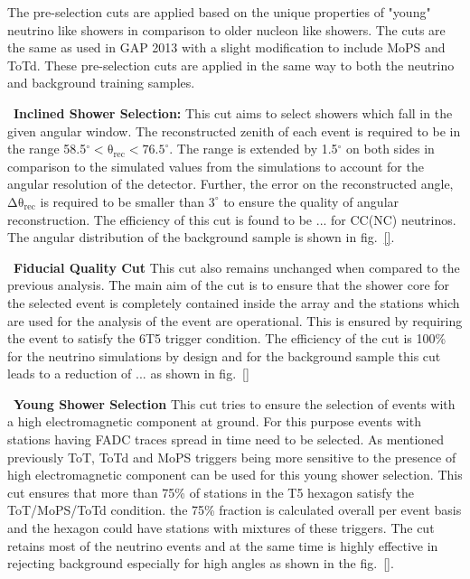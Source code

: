 The pre-selection cuts are applied based on the unique properties of "young" neutrino like showers in comparison to older nucleon like showers. The cuts are the same as used in GAP 2013 with a slight modification to include MoPS and ToTd. These pre-selection cuts are applied in the same way to both the neutrino and background training samples. 
\begin{description}
  \item ~\textbf{Inclined Shower Selection:} This cut aims to select showers which fall in the given angular window. The reconstructed zenith of each event is required to be in the range 58.5$^{\circ} < \mathrm{\theta_{rec} < 76.5^{\circ}}$. The range is extended by 1.5$^\circ$ on both sides in comparison to the simulated values from the simulations to account for the angular resolution of the detector. Further, the error on the reconstructed angle, $\mathrm{\Delta \theta_{rec}}$ is required to be smaller than $3^\circ$ to ensure the quality of angular reconstruction. The efficiency of this cut is found to be ... for CC(NC) neutrinos. The angular distribution of the background sample is shown in fig.~\ref{}.
  \item ~\textbf{Fiducial Quality Cut} This cut also remains unchanged when compared to the previous analysis. The main aim of the cut is to ensure that the shower core for the selected event is completely contained inside the array and the stations which are used for the analysis of the event are operational. This is ensured by requiring the event to satisfy the 6T5 trigger condition. The efficiency of the cut is 100\% for the neutrino simulations by design and for the background sample this cut leads to a reduction of ... as shown in fig.~\ref{}   
  \item ~\textbf{Young Shower Selection} This cut tries to ensure the selection of events with a high electromagnetic component at ground. For this purpose events with stations having FADC traces spread in time need to be selected. As mentioned previously ToT, ToTd and MoPS triggers being more sensitive to the presence of high electromagnetic component can be used for this young shower selection. This cut ensures that more than 75\% of stations in the T5 hexagon satisfy the ToT/MoPS/ToTd condition. the 75\% fraction is calculated overall per event basis and the hexagon could have stations with mixtures of these triggers. The cut retains most of the neutrino events and at the same time is highly effective in rejecting background especially for high angles as shown in the fig.~\ref{}.

\end{description}
